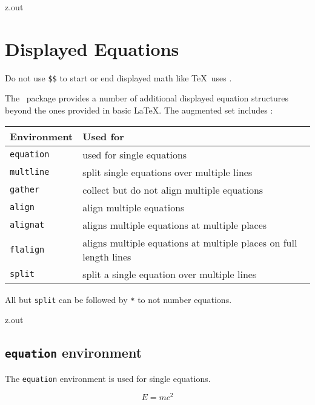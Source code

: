 \begin{VerbatimOut}{z.out}
\section{Displayed Equations}

Do not use \verb+$$+ to start or end displayed math like \TeX\ uses
\cite{gratzer2016}.

The \AMSmathLogo\ package provides a number
of additional displayed equation structures
beyond the ones provided in basic \LaTeX.
The augmented set includes
\cite{amslatex3project2019b}:

\begin{inlinetable}
  \begin{tabular}{@{}ll@{}}
    \toprule
    \textbf{Environment}& \textbf{Used for}\\
    \midrule
    \tt equation& used for single equations\\
    \tt multline& split single equations over multiple lines\\
    \tt gather& collect but do not align multiple equations\\
    \tt align& align multiple equations\\
    \tt alignat& aligns multiple equations at multiple places\\
    \tt flalign& aligns multiple equations at multiple places on full length lines\\
    \tt split& split a single equation over multiple lines\\
    \bottomrule
  \end{tabular}
\end{inlinetable}

All but \verb+split+ can be followed by \verb+*+ to not number equations.
\end{VerbatimOut}

\MyIO


\begin{VerbatimOut}{z.out}

\subsection{\texttt{equation} environment}

The \verb+equation+ environment is used for single equations.

\begin{equation}
  E = mc^2
\end{equation}
\end{VerbatimOut}


